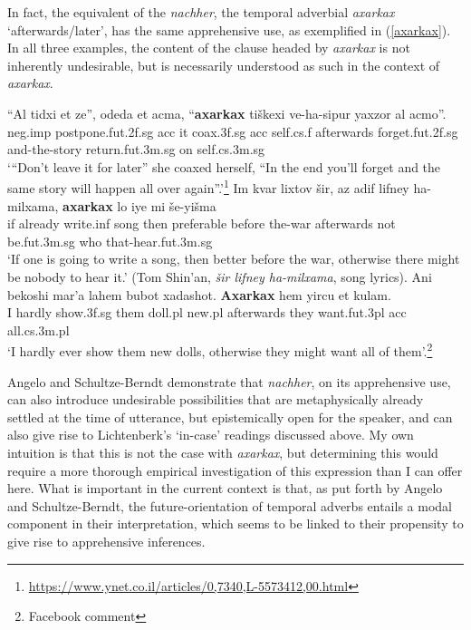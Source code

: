 \documentclass[output=paper,colorlinks,citecolor=brown]{langscibook}
\begin{document}
In fact, the  equivalent of the  \textit{nachher}, the temporal adverbial \textit{axarkax} `afterwards/later', has the same apprehensive use, as exemplified in (\ref{axarkax}). In all three examples, the content of the clause headed by \textit{axarkax} is not inherently undesirable, but is necessarily understood as such in the context of \textit{axarkax}.
\ea
\label{axarkax}
\begin{xlist}
\ex
\gll ``Al tidxi et ze'', odeda et acma, ``\textbf{axarkax} tiškexi ve-ha-sipur yaxzor al acmo''.\\
{\sc neg.imp} postpone.{\sc fut.2f.sg} {\sc acc} it coax.{\sc 3f.sg} {\sc acc} self.{\sc cs.f} afterwards forget.{\sc fut.2f.sg} and-the-story return.{\sc fut.3m.sg} on self.{\sc cs.3m.sg} \\
\glt `{}``Don't leave it for later'' she coaxed herself, ``In the end you'll forget and the same story will happen all over again''.'\footnote{\url{https://www.ynet.co.il/articles/0,7340,L-5573412,00.html}}
\ex 
\gll Im kvar lixtov šir, az adif lifney ha-milxama, \textbf{axarkax} lo iye mi še-yišma\\
if already write.{\sc inf} song then preferable before the-war afterwards not be.{\sc fut.3m.sg} who that-hear.{\sc fut.3m.sg}\\
\glt `If one is going to write a song, then better before the war, otherwise there might be nobody to hear it.' (Tom Shin'an, \textit{šir lifney ha-milxama}, song lyrics).
\ex
\gll Ani bekoshi mar'a lahem bubot xadashot. \textbf{Axarkax} hem yircu et kulam. \\
I hardly show.{\sc 3f.sg} them doll.{\sc pl} new.{\sc pl} afterwards they want.{\sc fut.3pl} {\sc acc} all.{\sc cs.3m.pl} \\

\glt `I hardly ever show them new dolls, otherwise they might want all of them'.\footnote{Facebook comment} 
\end{xlist}
\z

Angelo and Schultze-Berndt demonstrate that  \textit{nachher}, on its apprehensive use, can also introduce undesirable possibilities that are metaphysically already settled at the time of utterance, but epistemically open for the speaker, and can also give rise to Lichtenberk's `in-case' readings discussed above. My own intuition is that this is not the case with  \textit{axarkax}, but determining this would require a more thorough empirical investigation of this expression than I can offer here. What is important in the current context is that, as put forth by Angelo and Schultze-Berndt, the future-orientation of temporal adverbs entails a modal component in their interpretation, which seems to be linked to their propensity to give rise to apprehensive inferences.  
\end{document}
